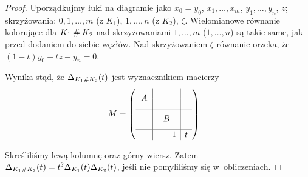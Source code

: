 \begin{proof}
\begin{comment}
        \strand[semithick] (30, 5) .. controls (22, 5) and (18, -5) .. (10, -5);
        \strand[semithick] (30,-5) .. controls (22, -5) and (18, 5) .. (10,  5);
        \strand[semithick] (10, 5) to (-10, 5);
        \strand[semithick,-Latex] (10, -5) to (-10, -5);

        \node[darkblue] at (-50,5) {$x_1,\ldots,x_{m-1}$};
        \node[red] at (-50,-5) {$1,\ldots,m$};

        \node[darkblue] at (50,5) {$y_1,\ldots,y_{n-1}$};
        \node[red] at (50,-5) {$1,\ldots,n$};

        \node[darkblue] at (-30,-5)[below right] {$x_m$};
        \node[darkblue] at (0,-5)[below] {$x_0 = y_0$};
        \node[darkblue] at (0, 5)[above] {$z$};
        \node[darkblue] at (30,-5)[below left] {$y_n$};
        \node[red] at ( 19.5,  1)[above]{$\zeta$};
        \node[red] at (-19.5,  1)[above]{$0$};
    \end{knot}
    \end{tikzpicture}\]
\end{comment}

    Uporządkujmy łuki na diagramie jako $x_0 = y_0$, $x_1, \ldots, x_m$, $y_1, \ldots, y_n$, $z$; skrzyżowania: $0, 1, \ldots, m$ (z $K_1$), $1, \ldots, n$ (z $K_2$), $\zeta$.
    Wielomianowe równanie kolorujące dla $K_1 \mathbin{\#} K_2$ nad skrzyżowaniami $1, \ldots, m$ ($1, \ldots, n$) są takie same, jak przed dodaniem do siebie węzłów.
    Nad skrzyżowaniem $\zeta$ równanie orzeka, że $(1-t)y_0+t z-y_n=0$.

    Wynika stąd, że $\Delta_{K_1 \mathbin{\#} K_2}(t)$ jest wyznacznikiem macierzy
    \begin{align*}
        M &= \left(\begin{array}{cc|cc|c}
            & & & & \\
            \multicolumn{2}{c|}{\smash{\raisebox{.5\normalbaselineskip}{$A$}}} & & \\
            \hline \\[-\normalbaselineskip]
            & & & & \\
            & & \multicolumn{2}{c|}{\smash{\raisebox{.5\normalbaselineskip}{$B$}}}\\ \hline
            & & & -1 & t
    \end{array}\right)
    \end{align*}

    Skreśliliśmy lewą kolumnę oraz górny wiersz.
    Zatem $\Delta_{K_1 \mathbin{\#} K_2}(t) = t^?\Delta_{K_1}(t) \Delta_{K_2}(t)$, jeśli nie pomyliliśmy się w~obliczeniach.
\end{proof}

